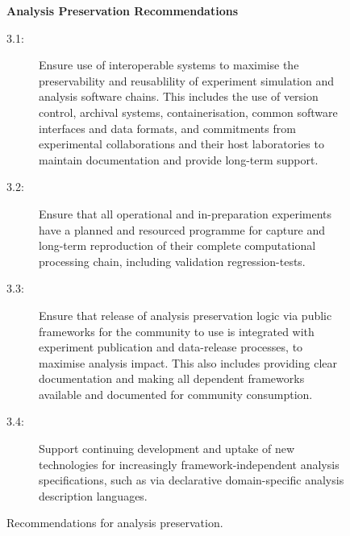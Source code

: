 \documentclass[11pt]{article}
\begin{document}
\begin{figure}[ht!]
\begin{tcolorbox}
\begin{center}
{\large \textbf{Analysis Preservation Recommendations}}
\end{center}
%
\begin{description}
   \item[3.1:] Ensure use of interoperable systems to maximise the preservability and reusablility of experiment simulation and analysis software chains. This includes the use of version control, archival systems, containerisation, common software interfaces and data formats, and commitments from experimental collaborations and their host laboratories to maintain documentation and provide long-term support.
   
   \item[3.2:] Ensure that all operational and in-preparation experiments have a planned and resourced programme for capture and long-term reproduction of their complete computational processing chain, including validation regression-tests.
   
   \item[3.3:] Ensure that release of \gls{analysis preservation} logic via public frameworks for the community to use is integrated with experiment publication and data-release processes, to maximise analysis impact. This also includes providing clear documentation and making all dependent frameworks available and documented for community consumption.

   \item[3.4:] Support continuing development and uptake of new technologies for increasingly framework-independent analysis specifications, such as via declarative domain-specific analysis description languages.

   
\end{description}
\end{tcolorbox}
\caption{Recommendations for analysis preservation.}
\label{fig:recs_analysispreservation}
\end{figure}
\end{document}

